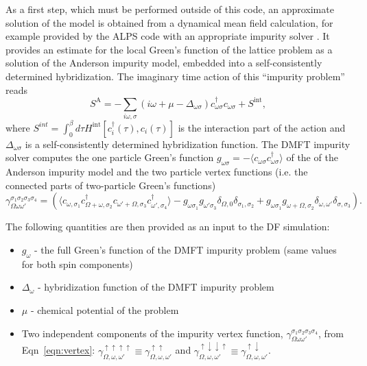 \documentclass[3p,times,procedia]{elsarticle}
\begin{document}
As a first step, which must be performed outside of this code, an approximate solution of the model is obtained from a dynamical mean field calculation, for example provided by the ALPS code \cite{ALPS2} with an appropriate impurity solver \cite{Hafermann2013a}.
It provides an estimate for the local Green's function of the lattice problem as a  solution of the Anderson impurity model, embedded into a self-consistently determined hybridization. The imaginary time action of this ``impurity problem''  reads  
\begin{equation}
S^{\mathrm{A}} = -\sum_{i\omega,\sigma} (i\omega + \mu - \Delta_{\omega\sigma}) c^\dagger_{\omega\sigma} c_{\omega\sigma} + S^{\mathrm{int}},
\end{equation}
where $S^{int} = \int_0^\beta d\tau H^{\mathrm{int}} [c^\dagger_i(\tau), c_i(\tau)] $ is the interaction part of the action and $\Delta_{\omega\sigma}$ is a self-consistently determined hybridization function. 
The DMFT impurity solver computes the one particle Green's function $g_{\omega\sigma} = -\langle c_{\omega\sigma} c^\dagger_{\omega\sigma} \rangle$ of the of the Anderson impurity model and the two particle vertex functions (i.e. the connected parts of two-particle Green's functions)  
\begin{equation}\label{eqn:vertex}
\gamma_{\Omega\omega\omega'}^{\sigma_1\sigma_2\sigma_3\sigma_4} = \left(\langle c_{\omega,\sigma_1} c^\dagger_{\Omega + \omega,\sigma_2} c_{\omega' + \Omega, \sigma_3} c^\dagger_{\omega', \sigma_4}\rangle - g_{\omega\sigma_1}g_{\omega'\sigma_3}\delta_{\Omega,0}\delta_{\sigma_1,\sigma_2} + g_{\omega\sigma_1} g_{\omega + \Omega, \sigma_2} \delta_{\omega,\omega'}\delta_{\sigma, \sigma_3} \right).
\end{equation}

The following quantities are then provided as an input to the DF simulation:
\begin{itemize}
\item $g_\omega$ - the full Green's function of the DMFT impurity problem (same values for both spin components)
\item $\Delta_{\omega}$ - hybridization function of the DMFT impurity problem
\item $\mu$ - chemical potential of the problem
\item Two independent components of the impurity vertex function, $\gamma_{\Omega\omega\omega'}^{\sigma_1\sigma_2\sigma_3\sigma_4}$, from Eqn~\eqref{eqn:vertex}: $\gamma_{\Omega,\omega,\omega'}^{\uparrow\uparrow\uparrow\uparrow} \equiv \gamma^{\uparrow\uparrow}_{\Omega,\omega,\omega'} $ and $\gamma_{\Omega,\omega,\omega'}^{\uparrow\downarrow\downarrow\uparrow} \equiv  \gamma^{\uparrow\downarrow}_{\Omega,\omega,\omega'} $.
\end{itemize}
\end{document}
